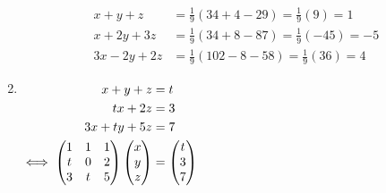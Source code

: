 \documentclass[fleqn,a4paper,11pt]{article}
\begin{document}
\begin{enumerate}[label=\textbf{\arabic*.}]
\begin{align*}
    x + y + z &= \tfrac 19(34 + 4 - 29) = \tfrac 19(9) = 1 \\
    x + 2y + 3z &= \tfrac 19(34 + 8 - 87) = \tfrac 19(-45) = -5 \\
    3x - 2y + 2z &= \tfrac 19(102 - 8 - 58) = \tfrac 19(36) = 4
   \end{align*}
  \item \(
   \begin{alignedat}[t]2
    && x + y + z &= t \\
    && tx + 2z &= 3 \\
    && 3x + ty + 5z &= 7 \\
    \iff{}&&
    \begin{pmatrix}
     1 & 1 & 1 \\
     t & 0 & 2 \\
     3 & t & 5
    \end{pmatrix}
    \begin{pmatrix} x \\ y \\ z \end{pmatrix}
     &= \begin{pmatrix} t \\ 3 \\ 7 \end{pmatrix}
   \end{alignedat}\)


\end{enumerate}
\end{document}
